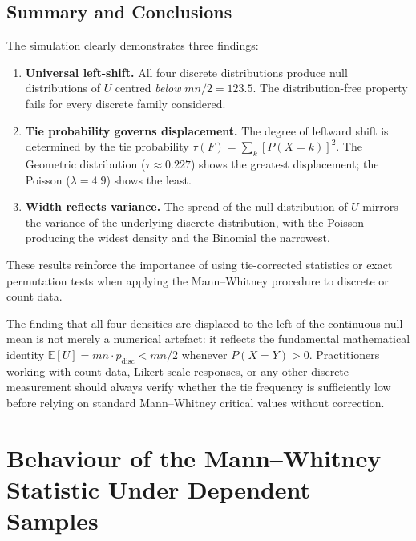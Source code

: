 \documentclass[10pt]{article}
\begin{document}
\subsection{Summary and Conclusions}

\begin{keyresult}
The simulation clearly demonstrates three findings:
\begin{enumerate}[noitemsep, label=(\roman*)]
  \item \textbf{Universal left-shift.}
        All four discrete distributions produce null distributions
        of $U$ centred \emph{below} $mn/2 = 123.5$. The
        distribution-free property fails for every discrete family
        considered.
  \item \textbf{Tie probability governs displacement.}
        The degree of leftward shift is determined by the tie
        probability $\tau(F) = \sum_k [P(X=k)]^2$. The Geometric
        distribution ($\tau \approx 0.227$) shows the greatest
        displacement; the Poisson ($\lambda = 4.9$) shows the
        least.
  \item \textbf{Width reflects variance.}
        The spread of the null distribution of $U$ mirrors the
        variance of the underlying discrete distribution, with the
        Poisson producing the widest density and the Binomial
        the narrowest.
\end{enumerate}
These results reinforce the importance of using tie-corrected
statistics or exact permutation tests when applying the
Mann--Whitney procedure to discrete or count data.
\end{keyresult}

The finding that all four densities are displaced to the left of
the continuous null mean is not merely a numerical artefact: it
reflects the fundamental mathematical identity
$\mathbb{E}[U] = mn \cdot p_{\text{disc}} < mn/2$ whenever
$P(X = Y) > 0$. Practitioners working with count data, Likert-scale
responses, or any other discrete measurement should always verify
whether the tie frequency is sufficiently low before relying on
standard Mann--Whitney critical values without correction.

\section{Behaviour of the Mann--Whitney Statistic Under
         Dependent Samples}
\end{document}
